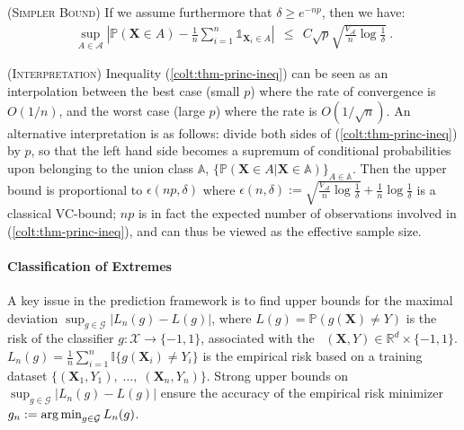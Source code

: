 \begin{remark} (\textsc{Simpler Bound})
If we assume furthermore that $\delta \ge e^{-np}$, then we have:
\begin{align*}
\sup_{A \in \mathcal{A}} \left | \mathbb{P}(\mathbf{X} \in A) - \frac{1}{n} \sum_{i=1}^n \mathds{1}_{\mathbf{X}_i \in A} \right| ~~\le~~ C \sqrt{p} \sqrt{\frac{V_{\mathcal{A}}}{n} \log{\frac{1}{\delta}}}~.
\end{align*}
\end{remark}

\begin{remark} (\textsc{Interpretation})
\label{colt:rk:interpretation}
Inequality (\ref{colt:thm-princ-ineq}) can be seen as an interpolation
between the best case (small $p$) where the rate of convergence is
$O(1/n)$,  %
and the worst case (large $p$) where the rate is $O(1/\sqrt{n})$.
An alternative interpretation is as follows: divide both sides of
(\ref{colt:thm-princ-ineq}) by $p$, so that the left hand side becomes  a
supremum of 
conditional probabilities   upon belonging to the union class
$\mathbb{A}$, $\{\mathbb{P}(\mathbf{X}\in A \big|\mathbf{X}\in \mathbb{A}) \}_{A\in\mathbb{A}}$. Then the upper bound is proportional to $\epsilon(np, \delta)$ where $\epsilon(n, \delta) :=\sqrt{\frac{V_{\mathcal{A}}}{n} \log{\frac{1}{\delta}}} + \frac{1}{n} \log{\frac{1}{\delta}}$ is a classical VC-bound; $np$ is in fact the expected number of observations involved in (\ref{colt:thm-princ-ineq}), and can thus be viewed as the effective sample size. %
\end{remark}


\paragraph{Classification of Extremes}
A key issue in the prediction framework is to find upper bounds for the maximal deviation $\sup_{g \in \mathcal{G}}|L_n(g) - L(g)|$, where $L(g) = \mathbb{P}(g(\mathbf{X}) \neq Y)$ is the risk of the classifier $g: \mathcal{X} \to \{-1, 1\}$, associated with the \rv~$(\mathbf{X},Y) \in \mathbb{R}^d \times \{-1,1\}$. $L_n(g) = \frac{1}{n} \sum_{i=1}^n \mathds{I}\{g(\mathbf{X}_i)\neq Y_i\} $ is the empirical risk based on a training dataset $\{(\mathbf{X}_1,Y_1),\; \ldots,\; (\mathbf{X}_n,Y_n)  \}$. Strong upper bounds on $\sup_{g \in \mathcal{G}}|L_n(g) - L(g)|$ ensure the accuracy of the empirical risk minimizer $g_n:= \argmin_{g \in \mathcal{G}}L_n(g)$. 

